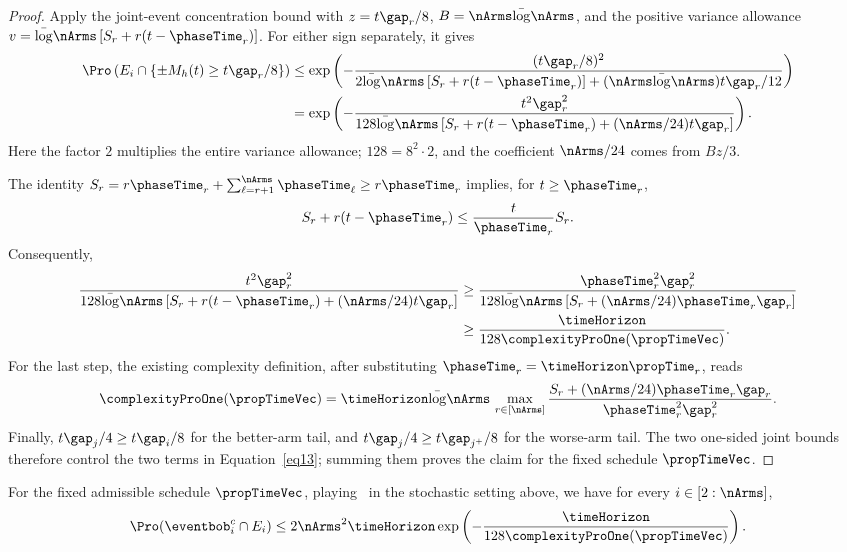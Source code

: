\begin{proof}
Apply the joint-event concentration bound with
$z=t\gap_r/8$, $B=\nArms\bar\log\nArms$, and the positive
variance allowance $v=\bar\log\nArms\,[S_r+r(t-\phaseTime_r)]$.
For either sign separately, it gives
\begin{align*}
\Pro\left(E_i\cap\{\pm M_h(t)\geq t\gap_r/8\}\right)
&\leq\exp\left(
-\frac{(t\gap_r/8)^2}
{2\bar\log\nArms\,[S_r+r(t-\phaseTime_r)]
+(\nArms\bar\log\nArms)t\gap_r/12}\right)\\
&=\exp\left(
-\frac{t^2\gap_r^2}
{128\bar\log\nArms\,[S_r+r(t-\phaseTime_r)
+(\nArms/24)t\gap_r]}\right).
\end{align*}
Here the factor $2$ multiplies the entire variance allowance;
$128=8^2\cdot2$, and the coefficient $\nArms/24$ comes from $Bz/3$.

The identity
$S_r=r\phaseTime_r+\sum_{\ell=r+1}^{\nArms}\phaseTime_\ell
\geq r\phaseTime_r$ implies, for $t\geq\phaseTime_r$,
\[
S_r+r(t-\phaseTime_r)\leq\frac{t}{\phaseTime_r}S_r.
\]
Consequently,
\begin{align*}
\frac{t^2\gap_r^2}
{128\bar\log\nArms\,[S_r+r(t-\phaseTime_r)
+(\nArms/24)t\gap_r]}
&\geq
\frac{\phaseTime_r^2\gap_r^2}
{128\bar\log\nArms\,[S_r+(\nArms/24)\phaseTime_r\gap_r]}\\
&\geq\frac{\timeHorizon}{128\complexityProOne(\propTimeVec)}.
\end{align*}
For the last step, the existing complexity definition, after
substituting $\phaseTime_r=\timeHorizon\propTime_r$, reads
\[
\complexityProOne(\propTimeVec)
=\timeHorizon\bar\log\nArms\,
\max_{r\in[\nArms]}
\frac{S_r+(\nArms/24)\phaseTime_r\gap_r}
{\phaseTime_r^2\gap_r^2}.
\]
Finally, $t\gap_j/4\geq t\gap_i/8$ for the better-arm tail,
and $t\gap_j/4\geq t\gap_{j^+}/8$ for the worse-arm tail.
The two one-sided joint bounds therefore control the two terms
in Equation~\ref{eq13}; summing them proves the claim for the
fixed schedule $\propTimeVec$.
\end{proof}
\begin{lemma}\label{l:errPOGerrPO}
For the fixed admissible schedule $\propTimeVec$, playing~\Pone{}
in the stochastic setting above, we have for every $i\in[2:\nArms]$,
\[
\Pro(\eventbob_i^c\cap E_i)
\leq2\nArms^2\timeHorizon
\exp\left(-\frac{\timeHorizon}
{128\complexityProOne(\propTimeVec)}\right).
\]
\end{lemma}
